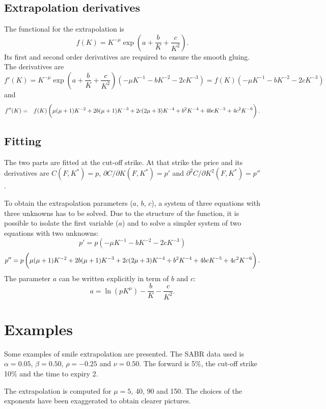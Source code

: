 \documentclass[]{amsart}
\begin{document}
\subsection{Extrapolation derivatives}
The functional for the extrapolation is
\[
f(K) = K^{-\mu} \exp\left( a + \frac{b}{K} + \frac{c}{K^2} \right).
\]
Its first and second order derivatives are required to ensure the smooth gluing. The derivatives are
\[
f'(K) = K^{-\mu} \exp\left( a + \frac{b}{K} + \frac{c}{K^2} \right) (-\mu K^{-1} - bK^{-2}-2cK^{-3}) = f(K)(-\mu K^{-1} - bK^{-2}-2cK^{-3})
\]
and
\begin{eqnarray*}
f''(K) & = & f(K) \left(\vphantom{\int} \mu(\mu+1)K^{-2}+2b(\mu+1)K^{-3}+2c(2\mu+3)K^{-4} + b^2 K^{-4} + 4bc K^{-5} + 4 c^2K^{-6} \right).
\end{eqnarray*}

\subsection{Fitting}

The two parts are fitted at the cut-off strike. At that strike the price and its derivatives are $C(F, K^*) = p$, $\partial C/\partial K(F, K^*) = p'$ and $\partial^2 C/\partial K^2(F, K^*) = p''$.

To obtain the extrapolation parameters ($a$, $b$, $c$), a system of three equations with three unknowns has to be solved. Due to the structure of the function, it is possible to isolate the first variable ($a$) and to solve a simpler system of two equations with two unknowns:
\[
p' = p\left(-\mu K^{-1} - bK^{-2}-2cK^{-3}\right)
\]
\[
p'' = p \left(\vphantom{\int} \mu(\mu+1)K^{-2}+2b(\mu+1)K^{-3}+2c(2\mu+3)K^{-4} + b^2 K^{-4} + 4bc K^{-5} + 4 c^2K^{-6} \right).
\]
The parameter $a$ can be written explicitly in term of $b$ and $c$:
\[
a = \ln(p K^{\mu}) - \frac{b}{K} - \frac{c}{K^2}.
\]

\section{Examples}

Some examples of smile extrapolation are presented. The SABR data used is $\alpha=0.05$, $\beta=0.50$, $\rho=-0.25$ and $\nu=0.50$. The forward is 5\%, the cut-off strike 10\% and the time to expiry 2.

The extrapolation is computed for $\mu=5$, 40, 90 and 150. The choices of the exponents have been exaggerated to obtain clearer pictures.

\end{document}
